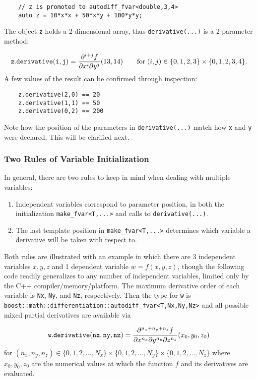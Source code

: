 \documentclass{article}
\begin{document}
\begin{verbatim}
    // z is promoted to autodiff_fvar<double,3,4>
    auto z = 10*x*x + 50*x*y + 100*y*y;
\end{verbatim}
The object {\tt z} holds a 2-dimensional array, thus {\tt derivative(...)} is a 2-parameter method:

\[
{\tt z.derivative(i,j)} = \frac{\partial^{i+j}f}{\partial x^i\partial y^j}(13,14)
    \qquad \text{for}\; (i,j)\in\{0,1,2,3\}\times\{0,1,2,3,4\}.
\]
A few values of the result can be confirmed through inspection:

\begin{verbatim}
    z.derivative(2,0) == 20
    z.derivative(1,1) == 50
    z.derivative(0,2) == 200
\end{verbatim}
Note how the position of the parameters in {\tt derivative(...)} match how {\tt x} and {\tt y} were declared.
This will be clarified next.

\subsubsection{Two Rules of Variable Initialization}

In general, there are two rules to keep in mind when dealing with multiple variables:

\begin{enumerate}
\item Independent variables correspond to parameter position, in both the initialization {\tt make\_fvar<T,...>}
    and calls to {\tt derivative(...)}.
\item The last template position in {\tt make\_fvar<T,...>} determines which variable a derivative will be
   taken with respect to.
\end{enumerate}
Both rules are illustrated with an example in which there are 3 independent variables $x,y,z$ and 1 dependent
variable $w=f(x,y,z)$, though the following code readily generalizes to any number of independent variables, limited
only by the C++ compiler/memory/platform. The maximum derivative order of each variable is {\tt Nx}, {\tt Ny}, and
{\tt Nz}, respectively. Then the type for {\tt w} is {\tt boost::math::differentiation::autodiff\_fvar<T,Nx,Ny,Nz>}
and all possible mixed partial derivatives are available via

\[
{\tt w.derivative(nx,ny,nz)} =
    \frac{\partial^{n_x+n_y+n_z}f}{\partial x^{n_x}\partial y^{n_y}\partial z^{n_z} }(x_0,y_0,z_0)
\]
for $(n_x,n_y,n_z)\in\{0,1,2,...,N_x\}\times\{0,1,2,...,N_y\}\times\{0,1,2,...,N_z\}$ where $x_0, y_0, z_0$ are
the numerical values at which the function $f$ and its derivatives are evaluated.
\end{document}
